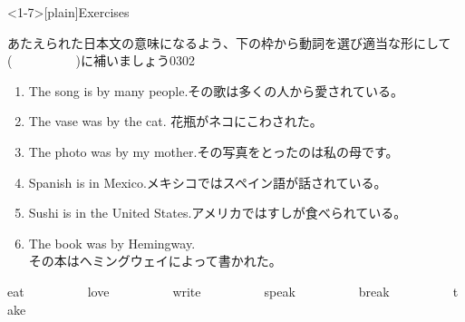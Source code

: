 \documentclass[aspectratio=169,xcolor={dvipsnames,table}]{beamer}
\newcommand{\myaudio}[1]{\href{#1}{\faVolumeUp}}
\begin{document}
\begin{frame}<1-7>[plain]{Exercises}

{\small あたえられた日本文の意味になるよう、下の枠から動詞を選び適当な形にして(~~~~~~~~~~)に補いましょう}\hfill{\tiny 0302}\,{\scriptsize \myaudio{./audio/051_passive_05.mp3}
}
\begin{enumerate}
 \item The song is  by many people.\hfill{\small その歌は多くの人から愛されている。}
 \item The vase was  by the cat. \hfill{\small 花瓶がネコにこわされた。}
 \item The photo was  by my mother.\hfill{\small その写真をとったのは私の母です。}
 \item Spanish is  in Mexico.\hfill{\small メキシコではスペイン語が話されている。}
 \item Sushi is  in the United States.\hfill{\small アメリカではすしが食べられている。}
 \item The book was  by Hemingway. \\
\hfill{\small その本はヘミングウェイによって書かれた。}
\end{enumerate}

\begin{tcolorbox}\centering
 eat~~~~~~~~~~love~~~~~~~~~~write~~~~~~~~~~speak~~~~~~~~~~break~~~~~~~~~~take
\end{tcolorbox}
\end{frame}
\end{document}
